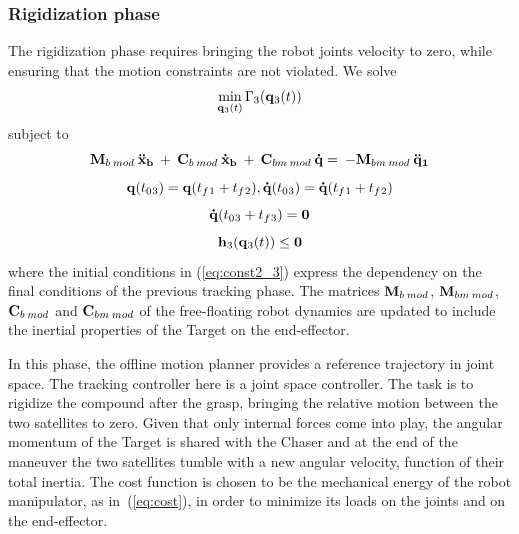 \subsubsection{Rigidization phase}
\label{sec:rigidization}
%
The rigidization phase requires bringing the robot joints velocity to zero, while ensuring that the motion constraints are not violated. We solve
\begin{equation}
\min_{\boldsymbol {\mathrm{q}}{}_{3}(t)} \Gamma{}_{3}(\boldsymbol {\mathrm{q}}{}_{3}(t))
\end{equation}
subject to 
\begin{equation}
\boldsymbol {\mathrm{M}}_{b\:mod}\: \boldsymbol {\mathrm{\ddot{x}_{b}}} \:+ \:\boldsymbol {\mathrm{C}}_{b\:mod}\:\boldsymbol {\mathrm{\dot{x}_{b}}}\: + \:\boldsymbol {\mathrm{C}}_{bm\:mod}\:\boldsymbol {\mathrm{\dot{q}}}=\:-\boldsymbol {\mathrm{M}}_{bm\:mod} \: \boldsymbol {\mathrm{\ddot{q}{}_1}}
\label{eq:dyn_mod}
\end{equation}
\begin{equation}
\boldsymbol {\mathrm{q}}(t_{0}{}_{3})=\boldsymbol {\mathrm{q}}(t_f{}_1+t_{f}{}_{2}),
\boldsymbol {\mathrm{\dot{q}}}(t_{0}{}_{3})=\boldsymbol {\mathrm{\dot{q}}}(t_f{}_1+t_{f}{}_{2})
\label{eq:const2_3}
\end{equation}
\begin{equation}
\boldsymbol {\mathrm{\dot{q}}}(t_{0}{}_{3}+t_{f}{}_{3})=\boldsymbol {\mathrm{0}}
\label{eq:const2_4}
\end{equation}
\begin{equation}
\boldsymbol {\mathrm{h}}{}_{3}(\boldsymbol {\mathrm{q}}{}_{3}(t)) \le \boldsymbol {\mathrm{0}}
\label{eq:const3_3}
\end{equation}
where the initial conditions in (\ref{eq:const2_3}) express the dependency on the final conditions of the previous tracking phase. The matrices $\boldsymbol {\mathrm{M}}{}_{b\:mod}$, $\boldsymbol {\mathrm{M}}_{bm\:mod}$, $\boldsymbol {\mathrm{C}}_{b\:mod}$ and $\boldsymbol {\mathrm{C}}_{bm\:mod}$ of the free-floating robot dynamics are updated to include the inertial properties of the Target on the end-effector.

In this phase, the offline motion planner provides a reference trajectory in joint space. The  tracking controller here is a joint space controller. The task is to rigidize the compound after the grasp, bringing the relative motion between the two satellites to zero. Given that only internal forces come into play, the angular momentum of the Target is shared with the Chaser and at the end of the maneuver the two satellites tumble with a new angular velocity, function of their total inertia. The cost function is chosen to be the mechanical energy of the robot manipulator, as in~(\ref{eq:cost}), in order to minimize its loads on the joints and on the end-effector. 

